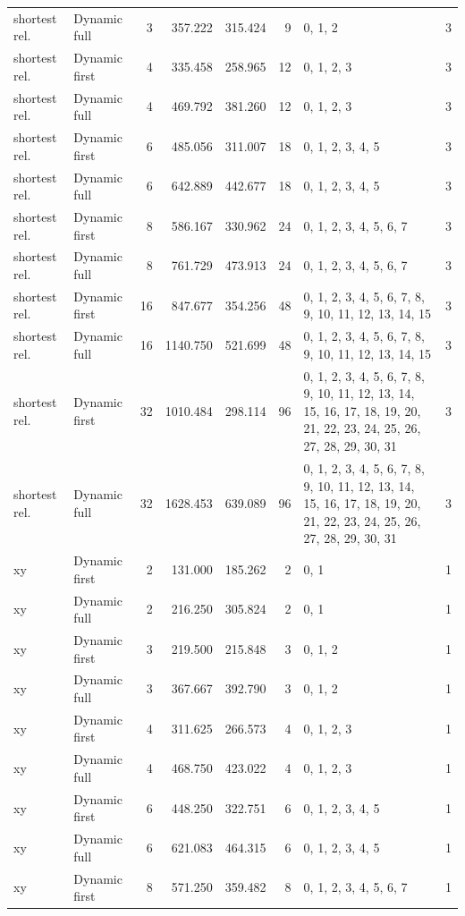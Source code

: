 \documentclass[10pt,a4paper]{article}
\begin{document}
\begin{longtable}{@{}p{23mm}p{29mm}rrrrp{36mm}r@{}}
shortest rel. & Dynamic full & 3 & 357.222 & 315.424 & 9 & 0, 1, 2 & 3 \\
shortest rel. & Dynamic first & 4 & 335.458 & 258.965 & 12 & 0, 1, 2, 3 & 3 \\
shortest rel. & Dynamic full & 4 & 469.792 & 381.260 & 12 & 0, 1, 2, 3 & 3 \\
shortest rel. & Dynamic first & 6 & 485.056 & 311.007 & 18 & 0, 1, 2, 3, 4, 5 & 3 \\
shortest rel. & Dynamic full & 6 & 642.889 & 442.677 & 18 & 0, 1, 2, 3, 4, 5 & 3 \\
shortest rel. & Dynamic first & 8 & 586.167 & 330.962 & 24 & 0, 1, 2, 3, 4, 5, 6, 7 & 3 \\
shortest rel. & Dynamic full & 8 & 761.729 & 473.913 & 24 & 0, 1, 2, 3, 4, 5, 6, 7 & 3 \\
shortest rel. & Dynamic first & 16 & 847.677 & 354.256 & 48 & 0, 1, 2, 3, 4, 5, 6, 7, 8, 9, 10, 11, 12, 13, 14, 15 & 3 \\
shortest rel. & Dynamic full & 16 & 1140.750 & 521.699 & 48 & 0, 1, 2, 3, 4, 5, 6, 7, 8, 9, 10, 11, 12, 13, 14, 15 & 3 \\
shortest rel. & Dynamic first & 32 & 1010.484 & 298.114 & 96 & 0, 1, 2, 3, 4, 5, 6, 7, 8, 9, 10, 11, 12, 13, 14, 15, 16, 17, 18, 19, 20, 21, 22, 23, 24, 25, 26, 27, 28, 29, 30, 31 & 3 \\
shortest rel. & Dynamic full & 32 & 1628.453 & 639.089 & 96 & 0, 1, 2, 3, 4, 5, 6, 7, 8, 9, 10, 11, 12, 13, 14, 15, 16, 17, 18, 19, 20, 21, 22, 23, 24, 25, 26, 27, 28, 29, 30, 31 & 3 \\
xy & Dynamic first & 2 & 131.000 & 185.262 & 2 & 0, 1 & 1 \\
xy & Dynamic full & 2 & 216.250 & 305.824 & 2 & 0, 1 & 1 \\
xy & Dynamic first & 3 & 219.500 & 215.848 & 3 & 0, 1, 2 & 1 \\
xy & Dynamic full & 3 & 367.667 & 392.790 & 3 & 0, 1, 2 & 1 \\
xy & Dynamic first & 4 & 311.625 & 266.573 & 4 & 0, 1, 2, 3 & 1 \\
xy & Dynamic full & 4 & 468.750 & 423.022 & 4 & 0, 1, 2, 3 & 1 \\
xy & Dynamic first & 6 & 448.250 & 322.751 & 6 & 0, 1, 2, 3, 4, 5 & 1 \\
xy & Dynamic full & 6 & 621.083 & 464.315 & 6 & 0, 1, 2, 3, 4, 5 & 1 \\
xy & Dynamic first & 8 & 571.250 & 359.482 & 8 & 0, 1, 2, 3, 4, 5, 6, 7 & 1 \\

\end{longtable}
\end{document}
